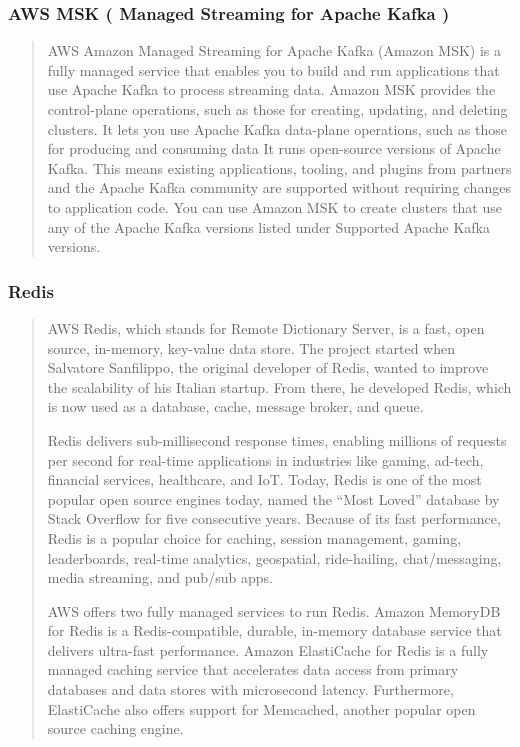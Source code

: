 \documentclass{csse4400}
\begin{document}
\subsubsection{AWS MSK ( Managed Streaming for Apache Kafka )}
\begin{quote}{AWS}
Amazon Managed Streaming for Apache Kafka (Amazon MSK) is a fully managed service that enables you to build and run applications that use Apache Kafka to process streaming data.
Amazon MSK provides the control-plane operations, such as those for creating, updating, and deleting clusters.
It lets you use Apache Kafka data-plane operations,
such as those for producing and consuming data
It runs open-source versions of Apache Kafka.
This means existing applications, tooling, and plugins from partners and the Apache Kafka community are supported without requiring changes to application code.
You can use Amazon MSK to create clusters that use any of the Apache Kafka versions listed under Supported Apache Kafka versions.
\end{quote}


\subsubsection{Redis}
\begin{quote}{AWS}
Redis, which stands for Remote Dictionary Server,
is a fast, open source, in-memory, key-value data store.
The project started when Salvatore Sanfilippo,
the original developer of Redis,
wanted to improve the scalability of his Italian startup.
From there, he developed Redis,
which is now used as a database, cache, message broker, and queue.

Redis delivers sub-millisecond response times,
enabling millions of requests per second for real-time applications in industries like gaming, ad-tech, financial services, healthcare, and IoT.
Today, Redis is one of the most popular open source engines today,
named the ``Most Loved'' database by Stack Overflow for five consecutive years.
Because of its fast performance,
Redis is a popular choice for caching, session management, gaming, leaderboards, real-time analytics, geospatial, ride-hailing, chat/messaging, media streaming, and pub/sub apps.
  
AWS offers two fully managed services to run Redis.
Amazon MemoryDB for Redis is a Redis-compatible, durable, in-memory database service that delivers ultra-fast performance.
Amazon ElastiCache for Redis is a fully managed caching service that accelerates data access from primary databases and data stores with microsecond latency.
Furthermore, ElastiCache also offers support for Memcached, another popular open source caching engine.
\end{quote}
\end{document}
